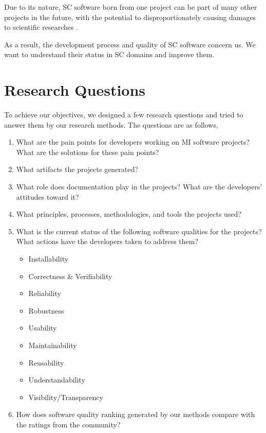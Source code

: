 Due to its nature, SC software born from one project can be part of many other projects in the future, with the potential to disproportionately causing damages to scientific researches \cite{Wilson2014}. 

As a result, the development process and quality of SC software concern us. We want to understand their status in SC domains and improve them.

\section{Research Questions}
\label{sec_research_questions}
To achieve our objectives, we designed a few research questions and tried to answer them by our research methods. The questions are as follows,

\begin{enumerate}
\item What are the pain points for developers working on MI software projects? What are the solutions for these pain points?
\item What artifacts the projects generated?
\item What role does documentation play in the projects? What are the developers' attitudes toward it?
\item What principles, processes, methodologies, and tools the projects used?
\item What is the current status of the following software qualities for the projects? What actions have the developers taken to address them?
\begin{itemize}
	\item Installability
	\item Correctness \& Verifiability
	\item Reliability
	\item Robustness
	\item Usability
	\item Maintainability
	\item Reusability
	\item Understandability
	\item Visibility/Transparency
\end{itemize}
\item How does software quality ranking generated by our methods compare with the ratings from the community?
\end{enumerate}


